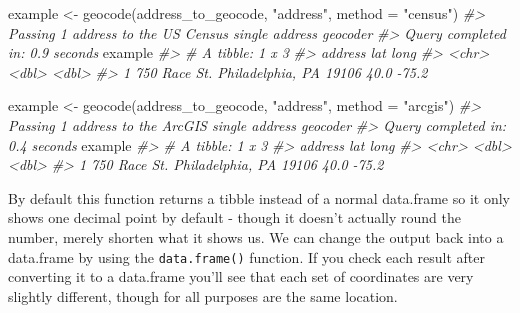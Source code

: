 \documentclass[
]{krantz}
\makeatletter
\newenvironment{Shaded}{\begin{snugshade}}{\end{snugshade}}
\newcommand{\AttributeTok}[1]{\textcolor[rgb]{0.61,0.61,0.61}{#1}}
\newcommand{\CommentTok}[1]{\textcolor[rgb]{0.37,0.37,0.37}{\textit{#1}}}
\newcommand{\FunctionTok}[1]{\textcolor[rgb]{0,0,0}{#1}}
\newcommand{\NormalTok}[1]{#1}
\newcommand{\OtherTok}[1]{\textcolor[rgb]{0.37,0.37,0.37}{#1}}
\newcommand{\StringTok}[1]{\textcolor[rgb]{0.5,0.5,0.5}{#1}}
\newenvironment{kframe}{%
\medskip{}
\setlength{\fboxsep}{.8em}
 \def\at@end@of@kframe{}%
 \ifinner\ifhmode%
  \def\at@end@of@kframe{\end{minipage}}%
  \begin{minipage}{\columnwidth}%
 \fi\fi%
 \def\FrameCommand##1{\hskip\@totalleftmargin \hskip-\fboxsep
 \colorbox{shadecolor}{##1}\hskip-\fboxsep
     \hskip-\linewidth \hskip-\@totalleftmargin \hskip\columnwidth}%
 \MakeFramed {\advance\hsize-\width
   \@totalleftmargin\z@ \linewidth\hsize
   \@setminipage}}%
 {\par\unskip\endMakeFramed%
 \at@end@of@kframe}
\renewenvironment{Shaded}{\begin{kframe}}{\end{kframe}}
\makeatother
\begin{document}
\begin{Shaded}
\begin{Highlighting}[]
\NormalTok{example }\OtherTok{\textless{}{-}} \FunctionTok{geocode}\NormalTok{(address\_to\_geocode, }\StringTok{"address"}\NormalTok{, }\AttributeTok{method =} \StringTok{"census"}\NormalTok{)}
\CommentTok{\#\textgreater{} Passing 1 address to the US Census single address geocoder}
\CommentTok{\#\textgreater{} Query completed in: 0.9 seconds}
\NormalTok{example}
\CommentTok{\#\textgreater{} \# A tibble: 1 x 3}
\CommentTok{\#\textgreater{}   address                               lat  long}
\CommentTok{\#\textgreater{}   \textless{}chr\textgreater{}                               \textless{}dbl\textgreater{} \textless{}dbl\textgreater{}}
\CommentTok{\#\textgreater{} 1 750 Race St. Philadelphia, PA 19106  40.0 {-}75.2}
\end{Highlighting}
\end{Shaded}

\begin{Shaded}
\begin{Highlighting}[]
\NormalTok{example }\OtherTok{\textless{}{-}} \FunctionTok{geocode}\NormalTok{(address\_to\_geocode, }\StringTok{"address"}\NormalTok{, }\AttributeTok{method =} \StringTok{"arcgis"}\NormalTok{)}
\CommentTok{\#\textgreater{} Passing 1 address to the ArcGIS single address geocoder}
\CommentTok{\#\textgreater{} Query completed in: 0.4 seconds}
\NormalTok{example}
\CommentTok{\#\textgreater{} \# A tibble: 1 x 3}
\CommentTok{\#\textgreater{}   address                               lat  long}
\CommentTok{\#\textgreater{}   \textless{}chr\textgreater{}                               \textless{}dbl\textgreater{} \textless{}dbl\textgreater{}}
\CommentTok{\#\textgreater{} 1 750 Race St. Philadelphia, PA 19106  40.0 {-}75.2}
\end{Highlighting}
\end{Shaded}

By default this function returns a tibble instead of a
normal data.frame so it only shows one decimal point by
default - though it doesn't actually round the number,
merely shorten what it shows us. We can change the output
back into a data.frame by using the \texttt{data.frame()}
function. If you check each result after converting it to a
data.frame you'll see that each set of coordinates are very
slightly different, though for all purposes are the same
location.
\end{document}
